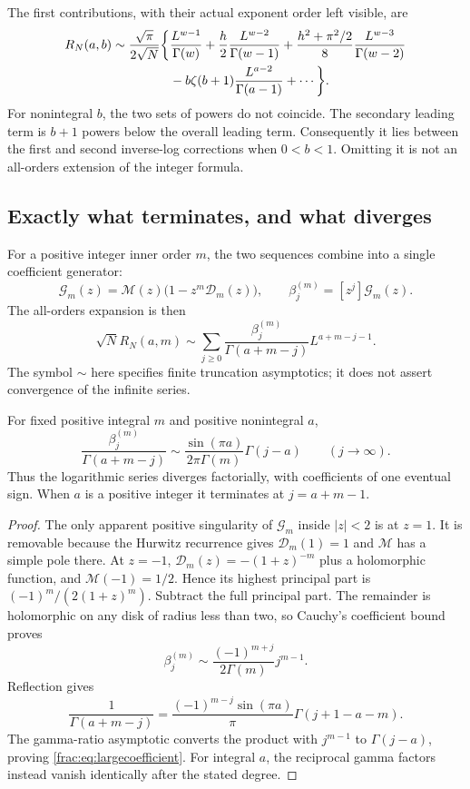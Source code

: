 The first contributions, with their actual exponent order left visible,
are
\begin{align}\label{frac:eq:first}
 R_N(a,b)\sim\frac{\sqrt\pi}{2\sqrt N}\bigg\{
 &\frac{L^{w-1}}{\Gamma(w)}
 +\frac h2\frac{L^{w-2}}{\Gamma(w-1)}
 +\frac{h^2+\pi^2/2}{8}\frac{L^{w-3}}{\Gamma(w-2)}\notag\\
 &-b\zeta(b+1)\frac{L^{a-2}}{\Gamma(a-1)}+\cdots\bigg\}.
\end{align}
For nonintegral $b$, the two sets of powers do not coincide. The
secondary leading term is $b+1$ powers below the overall leading term.
Consequently it lies between the first and second inverse-log
corrections when $0<b<1$. Omitting it is not an all-orders extension
of the integer formula.

\subsection{Exactly what terminates, and what diverges}

For a positive integer inner order $m$, the two sequences combine into
a single coefficient generator:
\begin{equation}\label{frac:eq:Gm}
 \mathcal G_m(z)=\mathcal M(z)\bigl(1-z^m\mathcal D_m(z)\bigr),
 \qquad \beta_j^{(m)}=[z^j]\mathcal G_m(z).
\end{equation}
The all-orders expansion is then
\[
 \sqrt N R_N(a,m)\sim\sum_{j\ge0}
     \frac{\beta_j^{(m)}}{\Gamma(a+m-j)}L^{a+m-j-1}.
\]
The symbol $\sim$ here specifies finite truncation asymptotics; it
does not assert convergence of the infinite series.

\begin{proposition}
\label{frac:prop:divergence}
For fixed positive integral $m$ and positive nonintegral $a$,
\begin{equation}\label{frac:eq:largecoefficient}
 \frac{\beta_j^{(m)}}{\Gamma(a+m-j)}
 \sim\frac{\sin(\pi a)}{2\pi\Gamma(m)}\Gamma(j-a)
 \qquad(j\to\infty).
\end{equation}
Thus the logarithmic series diverges factorially, with coefficients
of one eventual sign. When $a$ is a positive integer it terminates
at $j=a+m-1$.
\end{proposition}
\begin{proof}
The only apparent positive singularity of $\mathcal G_m$ inside
$|z|<2$ is at $z=1$. It is removable because the Hurwitz recurrence
gives $\mathcal D_m(1)=1$ and $\mathcal M$ has a simple pole there.
At $z=-1$, $\mathcal D_m(z)=-(1+z)^{-m}$ plus a holomorphic function,
and $\mathcal M(-1)=1/2$. Hence its highest principal part is
$(-1)^m/(2(1+z)^m)$. Subtract the full principal part. The remainder
is holomorphic on any disk of radius less than two, so Cauchy's
coefficient bound proves
\[
 \beta_j^{(m)}\sim\frac{(-1)^{m+j}}{2\Gamma(m)}j^{m-1}.
\]
Reflection gives
\[
 \frac1{\Gamma(a+m-j)}=
 \frac{(-1)^{m-j}\sin(\pi a)}\pi\Gamma(j+1-a-m).
\]
The gamma-ratio asymptotic converts the product with $j^{m-1}$
to $\Gamma(j-a)$, proving \eqref{frac:eq:largecoefficient}.
For integral $a$, the reciprocal gamma factors instead vanish
identically after the stated degree.
\end{proof}

